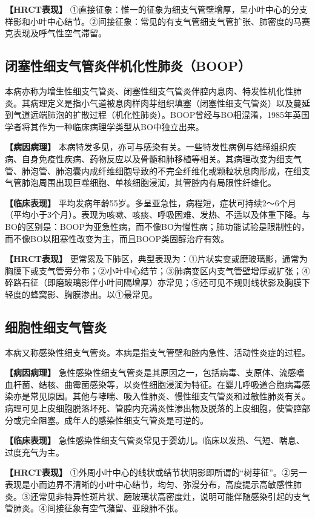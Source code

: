 \textbf{【HRCT表现】}
①直接征象：惟一的征象为细支气管壁增厚，呈小叶中心的分支样影和小叶中心结节。②间接征象：常见的有支气管细支气管扩张、肺密度的马赛克表现及呼气性空气滞留。

\subsection{闭塞性细支气管炎伴机化性肺炎（BOOP）}

本病亦称为增生性细支气管炎、闭塞性细支气管炎伴腔内息肉、特发性机化性肺炎。其病理定义是指小气道被息肉样肉芽组织填塞（闭塞性细支气管炎）以及蔓延到气道远端肺泡的扩散过程（机化性肺炎）。BOOP曾经与BO相混淆，1985年英国学者将其作为一种临床病理学类型从BO中独立出来。

\textbf{【病因病理】}
本病特发多见，亦可与感染有关。一些特发性病例与结缔组织疾病、自身免疫性疾病、药物反应以及骨髓和肺移植等相关。其病理改变为细支气管、肺泡管、肺泡囊内成纤维细胞导致的不完全纤维化或颗粒状息肉形成，在细支气管肺泡周围出现巨噬细胞、单核细胞浸润，其管腔内有局限性纤维化。

\textbf{【临床表现】}
平均发病年龄55岁。多呈亚急性，病程短，症状可持续2～6个月（平均小于3个月）。表现为咳嗽、咳痰、呼吸困难、发热、不适以及体重下降。与BO的区别是：BOOP为亚急性病，而不像BO为慢性病；肺功能试验是限制性的，而不像BO以阻塞性改变为主，而且BOOP类固醇治疗有效。

\textbf{【HRCT表现】}
更常累及下肺区，典型表现为：①片状实变或磨玻璃影，通常为胸膜下或支气管旁分布；②小叶中心结节；③肺病变区内支气管壁增厚或扩张；④碎路石征（即磨玻璃影伴小叶间隔增厚）亦常见；⑤还可见不规则线状影及胸膜下轻度的蜂窝影、胸膜渗出。以①最常见。

\subsection{细胞性细支气管炎}

本病又称感染性细支气管炎。本病是指支气管壁和腔内急性、活动性炎症的过程。

\textbf{【病因病理】}
急性感染性细支气管炎是其原因之一，包括病毒、支原体、流感嗜血杆菌、结核、曲霉菌感染等，以炎性细胞浸润为特征。在婴儿呼吸道合胞病毒感染亦是常见原因。其他与哮喘、吸入性肺炎、慢性细支气管炎和过敏性肺炎有关。病理可见上皮细胞脱落坏死、管腔内充满炎性渗出物及脱落的上皮细胞，使管腔部分或完全阻塞。成年人的感染性细支气管炎是可逆的。

\textbf{【临床表现】}
急性感染性细支气管炎常见于婴幼儿。临床以发热、气短、喘息、过度充气为主。

\textbf{【HRCT表现】}
①外周小叶中心的线状或结节状阴影即所谓的“树芽征”。②另一表现是小而边界不清晰的小叶中心结节，均匀、弥漫分布，高度提示高敏感性肺炎。③还常见非特异性斑片状、磨玻璃状高密度灶，说明可能伴随感染引起的支气管肺炎。④间接征象有空气潴留、亚段肺不张。

